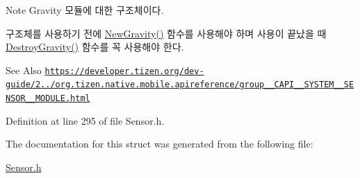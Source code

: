 \begin{DoxyNote}{Note}
Gravity 모듈에 대한 구조체이다. \par
 구조체를 사용하기 전에 \hyperlink{Sensor_8h_a300e5404c843b1366edef9183be709c6}{New\-Gravity()} 함수를 사용해야 하며 사용이 끝났을 때 \hyperlink{Sensor_8h_a4ac22619e930846038a60e69536844db}{Destroy\-Gravity()} 함수를 꼭 사용해야 한다. 
\end{DoxyNote}
\begin{DoxySeeAlso}{See Also}
\href{https://developer.tizen.org/dev-guide/2.3.0/org.tizen.native.mobile.apireference/group__CAPI__SYSTEM__SENSOR__MODULE.html}{\tt https\-://developer.\-tizen.\-org/dev-\/guide/2../org.\-tizen.\-native.\-mobile.\-apireference/group\-\_\-\-\_\-\-C\-A\-P\-I\-\_\-\-\_\-\-S\-Y\-S\-T\-E\-M\-\_\-\-\_\-\-S\-E\-N\-S\-O\-R\-\_\-\-\_\-\-M\-O\-D\-U\-L\-E.\-html} 
\end{DoxySeeAlso}


Definition at line 295 of file Sensor.\-h.



The documentation for this struct was generated from the following file\-:\begin{DoxyCompactItemize}
\item 
\hyperlink{Sensor_8h}{Sensor.\-h}\end{DoxyCompactItemize}
